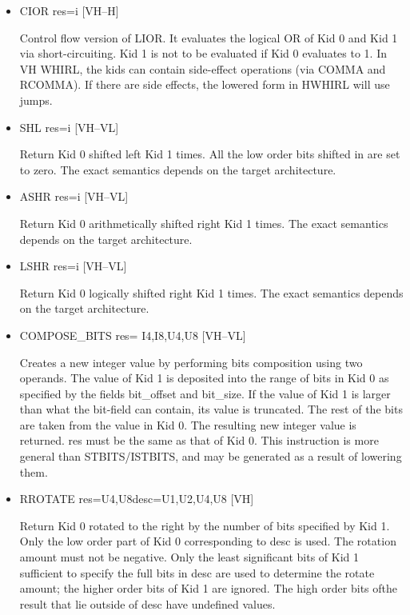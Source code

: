 \begin{itemize}
\item
{}%
CIOR res=i \hfill [VH--H]

Control flow version of
%
LIOR. It evaluates the logical OR of Kid
0 and Kid 1 via short-circuiting. Kid 1 is not to be evaluated if
Kid 0 evaluates to
1. In VH WHIRL, the kids can contain side-effect operations (via
%
COMMA and
%
RCOMMA). If there are side effects, the lowered form in
HWHIRL will use jumps.

\item
{}%
SHL res=i \hfill [VH--VL]

Return Kid 0 shifted left Kid 1 times. All the low order bits
shifted in are set to zero. The exact semantics depends on the target
architecture.

\item
{}%
ASHR res=i \hfill [VH--VL]

Return Kid 0 arithmetically shifted right Kid 1 times. The exact
semantics depends on the target architecture.

\item
{}%
LSHR res=i \hfill [VH--VL]

Return Kid 0 logically shifted right Kid 1 times. The exact semantics
depends on the target architecture.

%
\item  COMPOSE\_BITS res= I4,I8,U4,U8 \hfill [VH--VL]

Creates a new integer value by performing bits composition using
two operands. The value of Kid 1 is deposited into the range of bits
in Kid 0
as specified by the fields bit\_offset and bit\_size. If the value
of Kid 1 is larger than what the bit-field can contain, its value
is truncated. The rest of the bits are taken from the value in Kid
0. The resulting new integer value is returned. res must be the same
as that of Kid 0. This instruction is more general than
%
%
STBITS/ISTBITS,
and may be generated as a result of lowering them.

\item
{}%
RROTATE res=U4,U8desc=U1,U2,U4,U8 \hfill [VH]

Return Kid 0 rotated to the right by the number of bits specified
by Kid 1. Only the low order part of Kid 0 corresponding to desc is
used. The rotation amount must not be negative. Only the least
significant bits of Kid 1 sufficient to specify the full bits in
desc are used to determine the rotate amount; the higher order bits
of Kid 1 are ignored. The high order bits ofthe result that lie
outside of desc have undefined values.


\end{itemize}
